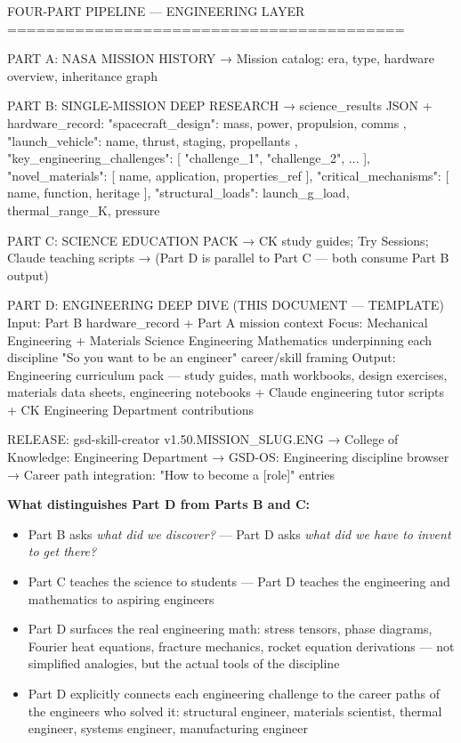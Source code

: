\documentclass[11pt,letterpaper]{article}
\begin{document}
\begin{asciibox}
FOUR-PART PIPELINE — ENGINEERING LAYER
=========================================

PART A: NASA MISSION HISTORY
  → Mission catalog: era, type, hardware overview, inheritance graph

PART B: SINGLE-MISSION DEEP RESEARCH
  → science_results JSON + hardware_record:
    {
      "spacecraft_design":     { mass, power, propulsion, comms },
      "launch_vehicle":        { name, thrust, staging, propellants },
      "key_engineering_challenges": [ "challenge_1", "challenge_2", ... ],
      "novel_materials":       [ { name, application, properties_ref } ],
      "critical_mechanisms":   [ { name, function, heritage } ],
      "structural_loads":      { launch_g_load, thermal_range_K, pressure }
    }

PART C: SCIENCE EDUCATION PACK
  → CK study guides; Try Sessions; Claude teaching scripts
  → (Part D is parallel to Part C — both consume Part B output)

PART D: ENGINEERING DEEP DIVE (THIS DOCUMENT — TEMPLATE)
  Input:  Part B hardware_record + Part A mission context
  Focus:  Mechanical Engineering + Materials Science
          Engineering Mathematics underpinning each discipline
          "So you want to be an engineer" career/skill framing
  Output: Engineering curriculum pack — study guides, math workbooks,
          design exercises, materials data sheets, engineering notebooks
          + Claude engineering tutor scripts
          + CK Engineering Department contributions

RELEASE: gsd-skill-creator v1.50.{MISSION_SLUG}.ENG
  → College of Knowledge: Engineering Department
  → GSD-OS: Engineering discipline browser
  → Career path integration: "How to become a [role]" entries
\end{asciibox}

\textbf{What distinguishes Part D from Parts B and C:}
\begin{itemize}[leftmargin=*, itemsep=2pt]
  \item Part B asks \textit{what did we discover?} --- Part D asks \textit{what did we have to invent to get there?}
  \item Part C teaches the science to students --- Part D teaches the engineering and mathematics to aspiring engineers
  \item Part D surfaces the real engineering math: stress tensors, phase diagrams, Fourier heat equations, fracture mechanics, rocket equation derivations --- not simplified analogies, but the actual tools of the discipline
  \item Part D explicitly connects each engineering challenge to the career paths of the engineers who solved it: structural engineer, materials scientist, thermal engineer, systems engineer, manufacturing engineer
\end{itemize}
\end{document}
